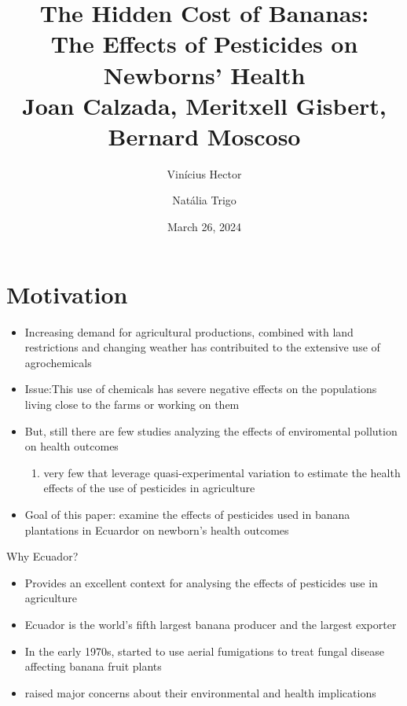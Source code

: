 \documentclass[hyperref={pdfpagelabels=false}]{beamer}
\title[The Hidden Cost of Bananas] { The Hidden Cost of Bananas:  \\ The Effects of Pesticides on Newborns’ Health  \\  \vspace{5mm} \large \textcolor{myblue}{Joan Calzada, Meritxell Gisbert, Bernard Moscoso} }
\author[Vinícius Hector and Natália Trigo]{ \normalsize Vinícius Hector \and Natália Trigo}
\date{March 26, 2024}
\institute[]{ \textcolor{myblue}{ \href{https://www.journals.uchicago.edu/doi/abs/10.1086/725349?journalCode=jaere}{JAERE (2023) }}\\ \vspace{2mm} Environmental and Urban Economics \\ Professor: Sophie Mattes}
\begin{document}
	
	\begin{frame}
		\titlepage
	\end{frame} 
	
	
	\begin{frame}
		\frametitle{}
		\tableofcontents
	\end{frame} 
	
	
	\section{Motivation} 
	\begin{frame}
		\begin{itemize}
			\justifying
			\item Increasing demand for agricultural  productions, combined with land restrictions and changing weather has contribuited to the extensive use of agrochemicals
			\vspace{2mm}
			\item \textcolor{bondiblue}{Issue}:This use of chemicals has severe negative effects on the populations living close to the farms or working on them
			\vspace{2mm}
			\item But, still there are few studies analyzing the effects of enviromental pollution on health outcomes
			\vspace{2mm}
			\begin{enumerate}
				\item very few that leverage quasi-experimental variation to estimate the health effects of the use of pesticides in agriculture
			\end{enumerate}
			\vspace{2mm}
			\item \textcolor{bondiblue}{Goal of this paper}: examine the effects of pesticides used in banana plantations in Ecuardor on newborn's health outcomes
		\end{itemize}
		
		
	\end{frame}
	
	
	\begin{frame}{Why Ecuador?}
		\begin{itemize}
			\justifying
			\item Provides an excellent context for analysing the effects of pesticides use in agriculture
			\vspace{2mm}
			\item Ecuador is the world's fifth largest banana producer and the largest exporter
			\vspace{2mm}
			\item In the early 1970s, started to use aerial fumigations to treat fungal disease affecting banana fruit plants
			\vspace{2mm}
			\item \textcolor{bondiblue}{raised major concerns about their environmental and health implications}
		\end{itemize}
	\end{frame}
	
\end{document}
